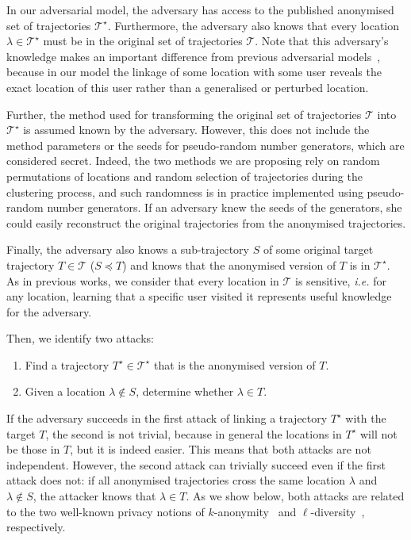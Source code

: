 In our adversarial model, the adversary has access to the
published anonymised set of trajectories
$\mathcal{T}^\star$. Furthermore, the adversary also knows that every
location $\lambda \in \mathcal{T}^{\star}$ must be in
the original set of trajectories $\mathcal{T}$.
Note that this adversary's knowledge makes an
important difference from
previous adversarial models~\cite{abul08, nergiz09, monreale10, yarovoy09},
because in our model the linkage of some location
with some user reveals the exact location of
this user rather than a generalised or perturbed location.

Further, the method used for
transforming the original set
of trajectories $\mathcal{T}$ into $\mathcal{T}^\star$ is
assumed known by the adversary. However, this does not
include the method parameters or the seeds for pseudo-random number generators, which are considered secret. Indeed, the two methods we
are proposing rely on random permutations of locations and
random selection of trajectories during the clustering process,
and such randomness is in practice implemented using pseudo-random number
generators.
If an adversary knew the seeds of the generators, she could
easily reconstruct the original trajectories from the anonymised
trajectories.

Finally, the adversary also knows a
sub-trajectory $S$ of some original target trajectory
$T \in \mathcal{T}$ ($S \preceq T$) and knows that the
anonymised version of $T$ is in $\mathcal{T}^\star$. As in previous works,
we consider that every location in $\mathcal{T}$ is sensitive, {\em i.e.}
for any location, learning that a specific user
visited it represents useful knowledge
for the adversary.

Then, we identify two attacks:
\begin{enumerate}
    \item Find a trajectory $T^{\star} \in \mathcal{T}^{\star}$
    that is the anonymised version of $T$.
    \item Given a location $\lambda \not\in S$,
    determine whether $\lambda \in T$.
\end{enumerate}

If the adversary succeeds in the first attack of
linking a trajectory $T^{\star}$ with the target $T$, the second
is not trivial, because in general the locations in
$T^{\star}$ will not be those in $T$, but it is indeed easier.
This means that both attacks
are not independent. However, the second attack
can trivially succeed even if the first attack does not:
if all anonymised trajectories cross the same location $\lambda$
and $\lambda \not\in S$, the attacker knows that $\lambda \in T$.
As we show below, both attacks are
related to the two well-known privacy notions of
$k$-anonymity~\cite{samarati98,sweeney02a} and
$\ell$-diversity~\cite{machanavajjhala06}, respectively.

